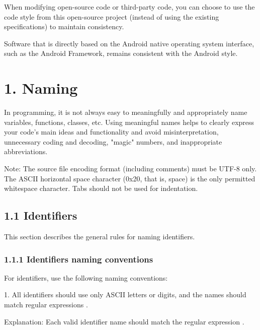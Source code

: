 {{{{When modifying open-source code or third-party code, you can choose to use the code style from this open-source project (instead of using the existing specifications) to maintain consistency.

Software that is directly based on the Android native operating system interface, such as the Android Framework, remains consistent with the Android style.

\section*{\textbf{1. Naming}}

\label{sec:1.}

In programming, it is not always easy to meaningfully and appropriately name variables, functions, classes, etc. Using meaningful names helps to clearly express your code's main ideas and functionality and avoid misinterpretation, unnecessary coding and decoding, "magic" numbers, and inappropriate abbreviations.



Note: The source file encoding format (including comments) must be UTF-8 only. The ASCII horizontal space character (0x20, that is, space) is the only permitted whitespace character. Tabs should not be used for indentation.



\subsection*{\textbf{1.1 Identifiers}}

\label{sec:1.1}

This section describes the general rules for naming identifiers.

\subsubsection*{\textbf{1.1.1 Identifiers naming conventions}}
\leavevmode\newline

\label{sec:1.1.1}



For identifiers, use the following naming conventions:

1.	All identifiers should use only ASCII letters or digits, and the names should match regular expressions \textbf{}.

Explanation: Each valid identifier name should match the regular expression \textbf{}.

}}}}
